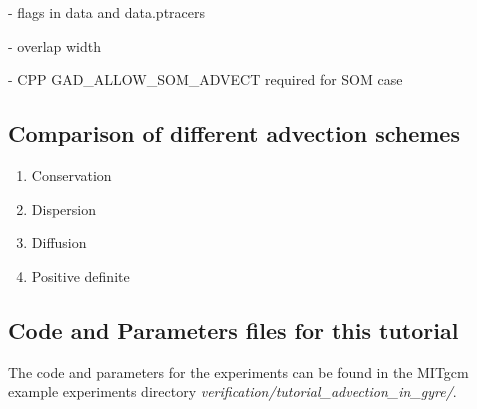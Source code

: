 - flags in data and data.ptracers

- overlap width

- CPP GAD\_ALLOW\_SOM\_ADVECT required for SOM case

\subsection{Comparison of different advection schemes}

\begin{enumerate}
\item{Conservation}
\item{Dispersion}
\item{Diffusion}
\item{Positive definite}
\end{enumerate}

\subsection{Code and Parameters files for this tutorial}

The code and parameters for the experiments can be found in the MITgcm example experiments 
directory {\it verification/tutorial\_advection\_in\_gyre/}.







